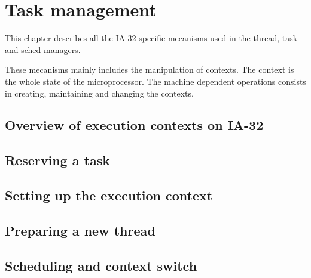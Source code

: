 
%
%

\chapter{Task management}

This chapter describes all the IA-32 specific mecanisms used in the
thread, task and sched managers.

These mecanisms mainly includes the manipulation of contexts. The
context is the whole state of the microprocessor. The machine
dependent operations consists in creating, maintaining and changing
the contexts.

\newpage

%
%

\section{Overview of execution contexts on IA-32}

%
%

\section{Reserving a task}

%
%

\section{Setting up the execution context}

%
%

\section{Preparing a new thread}

%
%

\section{Scheduling and context switch}

